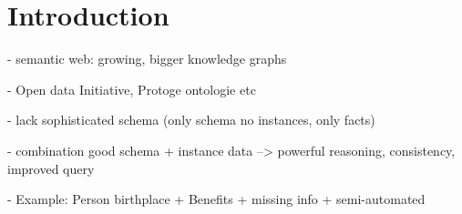 \section{Introduction}

- semantic web: growing, bigger knowledge graphs

- Open data Initiative, Protoge ontologie etc

- lack sophisticated schema (only schema no instances, only facts)

- combination good schema + instance data  --> powerful reasoning, consistency,
improved query

- Example: Person birthplace
  + Benefits
  + missing info
  + semi-automated





